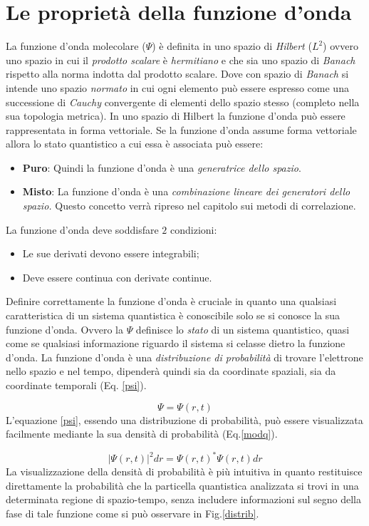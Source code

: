 \documentclass[oneside]{amsbook}
\numberwithin{section}{chapter}
\numberwithin{equation}{section}
\numberwithin{figure}{section}
\begin{document}
\section{Le proprietà della funzione d'onda}
La funzione d'onda molecolare ($\Psi$) è definita in uno spazio di \emph{Hilbert} ($L^2$) ovvero uno spazio in cui il \emph{prodotto scalare} è \emph{hermitiano} e che sia uno spazio di \emph{Banach} rispetto alla norma indotta dal prodotto scalare. Dove con spazio di \emph{Banach} si intende uno spazio \emph{normato} in cui ogni elemento può essere espresso come una successione di \emph{Cauchy} convergente di elementi dello spazio stesso (completo nella sua topologia metrica). In uno spazio di Hilbert la funzione d'onda può essere rappresentata in forma vettoriale. Se la funzione d'onda assume forma vettoriale allora lo stato quantistico a cui essa è associata può essere:
\begin{itemize}
\item \textbf{Puro}: Quindi la funzione d'onda è una \emph{generatrice dello spazio}.
\item \textbf{Misto}: La funzione d'onda è una \emph{combinazione lineare dei generatori dello spazio.} Questo concetto verrà ripreso nel capitolo sui metodi di correlazione.
\end{itemize}
 La funzione d'onda deve soddisfare $2$ condizioni:
\begin{itemize}
\item Le sue derivati devono essere integrabili;
\item Deve essere continua con derivate continue.
\end{itemize} 
Definire correttamente la funzione d'onda è cruciale in quanto una qualsiasi caratteristica di un sistema quantistica è conoscibile solo se si conosce la sua funzione d'onda. Ovvero la $\Psi$ definisce lo \emph{stato }di un sistema quantistico, quasi come se qualsiasi informazione riguardo il sistema si celasse dietro la funzione d'onda. La funzione d'onda è una \emph{distribuzione di probabilità} di trovare l'elettrone nello spazio e nel tempo, dipenderà quindi sia da coordinate spaziali, sia da coordinate temporali (Eq. \ref{psi}).

\begin{equation}
\label{psi}
\Psi=\Psi(r,t)
\end{equation}
L'equazione \ref{psi}, essendo una distribuzione di probabilità, può essere visualizzata facilmente mediante la sua densità di probabilità (Eq.\ref{modq}).

\begin{equation}
\label{modq}
\rvert\Psi(r,t)\rvert^2 d r= \Psi(r,t)^{*} \Psi(r,t)dr
\end{equation}
La visualizzazione della densità di probabilità è più intuitiva in quanto restituisce direttamente la probabilità che la particella quantistica analizzata si trovi in una determinata regione di spazio-tempo, senza includere informazioni sul segno della fase di tale funzione come si può osservare in Fig.\ref{distrib}.
\end{document}
